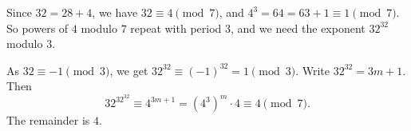 Since $32=28+4$, we have $32\equiv4\pmod7$, and $4^3=64=63+1\equiv1\pmod7$. So powers of $4$ modulo $7$ repeat with period $3$, and we need the exponent $32^{32}$ modulo $3$.

As $32\equiv-1\pmod3$, we get $32^{32}\equiv(-1)^{32}=1\pmod3$. Write $32^{32}=3m+1$. Then
\[
32^{32^{32}}\equiv4^{3m+1}=\left(4^3\right)^m\cdot4\equiv4\pmod7 .
\]
The remainder is $\boxed{4}$.
